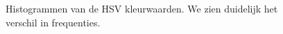 \documentclass[a4paper,kulak]{kulakarticle}
\begin{document}
	\begin{figure}[H]
		\centering
		\qquad
		\qquad
		
		\caption{Histogrammen van de HSV kleurwaarden. We zien duidelijk het verschil in frequenties.}
		\label{figuur HSVHIST}
	\end{figure}
\end{document}
